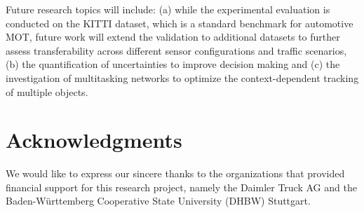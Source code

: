 \documentclass[letterpaper, 10 pt, journal, twoside]{IEEEtran}
\newcommand{\menz}[1]{ \noindent {\color{red} [{\bf Markus:} {#1}]} }
\begin{document}
Future research topics will include: (a) while the experimental evaluation is conducted on the KITTI dataset, which is a standard benchmark for automotive \ac{MOT}, future work will extend the validation to additional datasets to further assess transferability across different sensor configurations and traffic scenarios, (b) the quantification of uncertainties to improve decision making and (c) the investigation of multitasking networks to optimize the context-dependent tracking of multiple objects.

\section*{Acknowledgments}
We would like to express our sincere thanks to the organizations that provided financial support for this research project, namely the Daimler Truck AG and the Baden-Württemberg Cooperative State University (DHBW) Stuttgart.





\vfill
\end{document}
